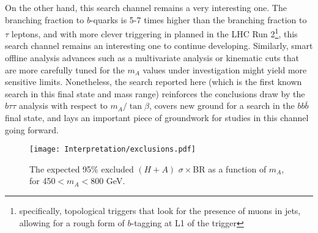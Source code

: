 On the other hand, this search channel remains a very interesting one.  The branching
fraction to $b$-quarks is 5-7 times higher than the branching fraction to $\tau$ leptons,
and with more clever triggering in planned in the LHC Run 2\footnote{specifically, topological triggers that look
for the presence of muons in jets, allowing for a rough form of $b$-tagging at L1 of the trigger}, 
this search channel remains an interesting one to continue developing.  Similarly, 
smart offline analysis advances such as a multivariate analysis or kinematic cuts that are 
more carefully tuned for the $m_A$ values under investigation might yield more sensitive limits.
Nonetheless, the search reported here (which is the first known search in this final state and mass range)
reinforces the conclusions draw by the $b\tau\tau$ analysis with respect to $m_A/\tan\beta$,
covers new ground for a search in the $bb\bar{b}$ final state, and lays an important piece of groundwork
for studies in this channel going forward.


\begin{figure}[hbt]
\center
\texttt{[image: Interpretation/exclusions.pdf]}
\caption{The expected 95\% excluded $(H+A)$ $\sigma\times$BR as a function of $m_A$, 
for 450$<m_A<$800 GeV.
\label{fig:exclusions}}
\end{figure}







